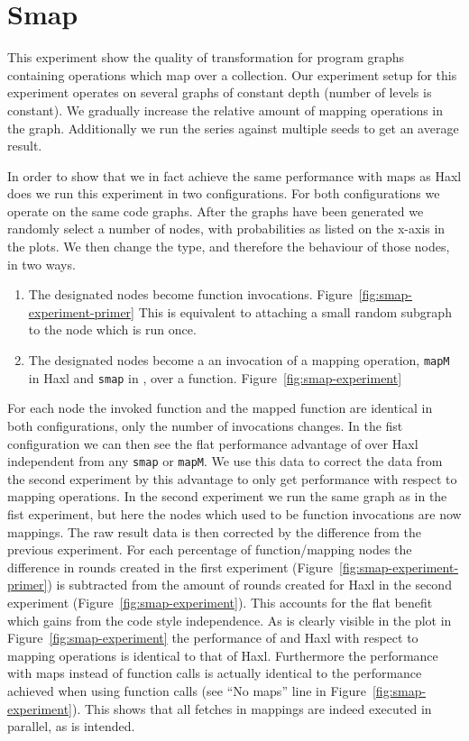 \section{Smap}

This experiment show the quality of transformation for program graphs containing operations which map over a collection.
Our experiment setup for this experiment operates on several graphs of constant depth (number of levels is constant).
We gradually increase the relative amount of mapping operations in the graph.
Additionally we run the series against multiple seeds to get an average result.

In order to show that we in fact achieve the same performance with maps as Haxl does we run this experiment in two configurations.
For both configurations we operate on the same code graphs.
After the graphs have been generated we randomly select a number of nodes, with probabilities as listed on the x-axis in the plots.
We then change the type, and therefore the behaviour of those nodes, in two ways.

\begin{enumerate}
  \item The designated nodes become function invocations. Figure~\ref{fig:smap-experiment-primer}
        This is equivalent to attaching a small random subgraph to the node which is run once.
  \item The designated nodes become a an invocation of a mapping operation, \texttt{mapM} in Haxl and \texttt{smap} in \yauhau{}, over a function. Figure~\ref{fig:smap-experiment}
\end{enumerate}

For each node the invoked function and the mapped function are identical in both configurations, only the number of invocations changes.
In the fist configuration we can then see the flat performance advantage of \yauhau{} over Haxl independent from any \texttt{smap} or \texttt{mapM}.
We use this data to correct the data from the second experiment by this advantage to only get performance with respect to mapping operations.
In the second experiment we run the same graph as in the fist experiment, but here the nodes which used to be function invocations are now mappings.
The raw result data is then corrected by the difference from the previous experiment.
For each percentage of function/mapping nodes the difference in rounds created in the first experiment (Figure~\ref{fig:smap-experiment-primer}) is subtracted from the amount of rounds created for Haxl in the second experiment (Figure~\ref{fig:smap-experiment}).
This accounts for the flat benefit which \yauhau{} gains from the code style independence.
As is clearly visible in the plot in Figure~\ref{fig:smap-experiment} the performance of \yauhau{} and Haxl with respect to mapping operations is identical to that of Haxl.
Furthermore the performance with maps instead of function calls is actually identical to the performance achieved when using function calls (see ``No maps'' line in Figure~\ref{fig:smap-experiment}).
This shows that all fetches in mappings are indeed executed in parallel, as is intended.

